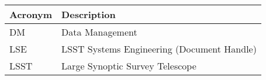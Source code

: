 \addtocounter{table}{-1}
\begin{longtable}{|l|p{}|}\hline
\textbf{Acronym} & \textbf{Description}  \\\hline

DM & Data Management \\\hline
LSE & LSST Systems Engineering (Document Handle) \\\hline
LSST & Large Synoptic Survey Telescope \\\hline
\end{longtable}
